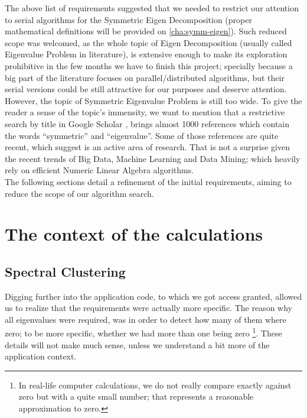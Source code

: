 The above list of requirements suggested that we needed to restrict
our attention to serial algorithms for the Symmetric Eigen
Decomposition (proper mathematical definitions will be provided on
\cref{cha:symm-eigen}). Such reduced scope was welcomed, as the whole
topic of Eigen Decomposition (usually called Eigenvalue Problem in
literature), is extensive enough to make its exploration prohibitive in
the few months we have to finish this project; specially because a big
part of the literature focuses on parallel/distributed algorithms, but
their serial versions could be still attractive for our purposes and
deserve attention. \\

However, the topic of Symmetric Eigenvalue Problem is still too wide. To give
the reader a sense of the topic's immensity, we want to mention that a
restrictive search by title in Google Scholar
\cite{googlescholar}, brings almost 1000 references which contain the
words ``symmetric'' and ``eigenvalue''. Some of those references
are quite recent, which suggest is an active area of research. That is
not a surprise given the recent trends of Big Data, Machine Learning
and Data Mining; which heavily rely on efficient Numeric Linear
Algebra algorithms. \\

The following sections detail a refinement of the initial
requirements, aiming to reduce the scope of our algorithm search. 

\section{The context of the calculations}

\subsection{Spectral Clustering}
Digging further into the application code, to which we got access
granted, allowed us to realize that the requirements were actually
more specific. The reason why all eigenvalues were required, was in
order to detect how many of them where zero; to be more specific,
whether we had more than one being zero \footnote{In real-life
  computer calculations, we do not really compare exactly against
  zero but with a quite small number; that represents a reasonable
  approximation to zero.}. These details
will not make much sense, unless we understand a bit more of the
application context. \\

